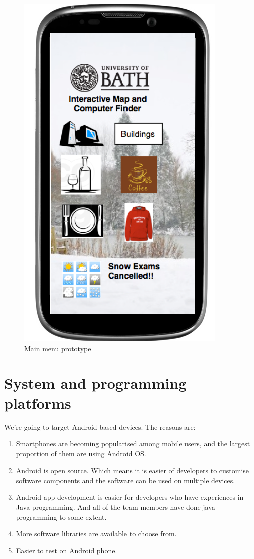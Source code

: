 \documentclass[10pt,a4paper,oneside]{report}
\begin{document}
\begin{figure}[H]
 \caption{Main menu prototype}
 \centering
 \includegraphics[keepaspectratio, scale=0.4]{prototype.png}
\end{figure}

\section*{System and programming platforms}
We're going to target Android based devices. The reasons are:
\begin{enumerate}
\item{Smartphones are becoming popularised among mobile users, and the largest proportion of them are using Android OS.}
\item{Android is open source. Which means it is easier of developers to customise software components and the software can be used on multiple devices.}
\item{Android app development is easier for developers who have experiences in Java programming.  And all of the team members have done java programming to some extent.}
\item{More software libraries are available to choose from.}
\item{Easier to test on Android phone.}
\end{enumerate}
\end{document}
